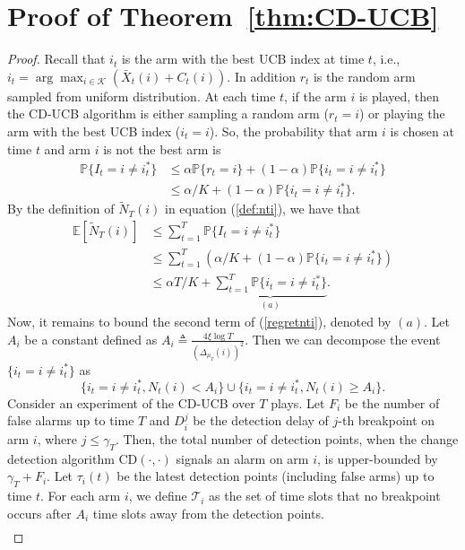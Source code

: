 \documentclass[letterpaper]{article} %
\begin{document}
\section{Proof of Theorem~\ref{thm:CD-UCB}}
\begin{proof}
Recall that $i_t$ is the arm with the best UCB index at time $t$, i.e., $i_t=\arg\max_{i\in\mathcal{K}}\left(\bar{X}_t(i)+C_t(i)\right)$. In addition $r_t$ is the random arm sampled from uniform distribution.
At each time $t$, if the arm $i$ is played, then the CD-UCB algorithm is either sampling a random arm ($r_t=i$) or playing the arm with the best UCB index ($i_t=i$).
So, the probability that arm $i$ is chosen at time $t$ and arm $i$ is not the best arm is
\begin{align}\nonumber
\mathbb{P}\{I_t=i\neq i^*_t\}&\leq \alpha\mathbb{P}\{r_t=i\}+(1-\alpha)\mathbb{P}\{i_t=i\neq i^*_t\}\\
&\leq \alpha/K+(1-\alpha)\mathbb{P}\{i_t=i\neq i^*_t\}.
\end{align}
By the definition of $\tilde{N}_T(i)$ in equation (\ref{def:nti}), we have that
\begin{align}
\mathbb{E}[\tilde{N}_T(i)]&\leq \sum_{t=1}^T\mathbb{P}\{I_t=i\neq i^*_t\}\\
&\leq \sum_{t=1}^T\left(\alpha/K+(1-\alpha)\mathbb{P}\{i_t=i\neq i^*_t\}\right)\\
&\leq \alpha T/K +
\underbrace{\sum_{t=1}^T\mathbb{P}\{i_t=i\neq i^*_t\}}_{(a)}.
\label{regretnti}
\end{align}
Now, it remains to bound the second term of (\ref{regretnti}), denoted by $(a)$. Let $A_i$ be a constant defined as $A_i\triangleq\frac{4\xi\log T}{(\Delta_{\mu_T}(i))^2}$. Then we can decompose the event $\{i_t=i\neq i^*_t\}$ as
\begin{equation*}
\{i_t=i\neq i^*_t,N_t(i)<A_i\}\cup\{i_t=i\neq i^*_t,N_t(i)\geq A_i\}.
\end{equation*}
Consider an experiment of the CD-UCB over $T$ plays. Let $F_i$ be the number of false alarms up to time $T$ and $D_i^j$ be the detection delay of $j$-th breakpoint on arm $i$, where $j\leq \gamma_T$. Then, the total number of detection points, when the change detection algorithm CD$(\cdot,\cdot)$ signals an alarm on arm $i$, is upper-bounded by $\gamma_T+F_i$. Let $\tau_i(t)$ be the latest detection points (including false arms) up to time $t$. For each arm $i$, we define $\mathcal{T}_i$ as the set of time slots that no breakpoint occurs after $A_i$ time slots away from the detection points.
\begin{align}\nonumber

\end{align}
\end{proof}
\end{document}
